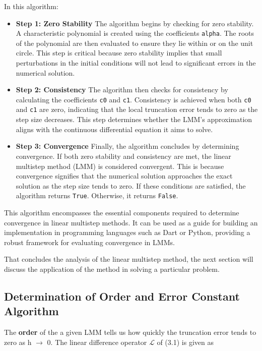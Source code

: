 \documentclass[a4paper, twoside]{report} %
\begin{document}
	In this algorithm:

	\begin{itemize}
		\item \textbf{Step 1: Zero Stability}
		The algorithm begins by checking for zero stability. A characteristic polynomial is created using the coefficients \texttt{alpha}. The roots of the polynomial are then evaluated to ensure they lie within or on the unit circle. This step is critical because zero stability implies that small perturbations in the initial conditions will not lead to significant errors in the numerical solution.

		\item \textbf{Step 2: Consistency}
		The algorithm then checks for consistency by calculating the coefficients \texttt{c0} and \texttt{c1}. Consistency is achieved when both \texttt{c0} and \texttt{c1} are zero, indicating that the local truncation error tends to zero as the step size decreases. This step determines whether the LMM's approximation aligns with the continuous differential equation it aims to solve.

		\item \textbf{Step 3: Convergence}
		Finally, the algorithm concludes by determining convergence. If both zero stability and consistency are met, the linear multistep method (LMM) is considered convergent. This is because convergence signifies that the numerical solution approaches the exact solution as the step size tends to zero. If these conditions are satisfied, the algorithm returns \texttt{True}. Otherwise, it returns \texttt{False}.

	\end{itemize}

	This algorithm encompasses the essential components required to determine convergence in linear multistep methods. It can be used as a guide for building an implementation in programming languages such as Dart or Python, providing a robust framework for evaluating convergence in LMMs.


	That concludes the analysis of the linear multistep method, the next section will discuss the application of the method in solving a particular problem.



	\subsection{Determination of Order and Error Constant Algorithm}

	The \textbf{order} of the a given LMM tells us how quickly the truncation error tends to zero as h $\to$ 0. The linear difference operator $\mathcal{L}$ of (3.1) is given as
\end{document}
